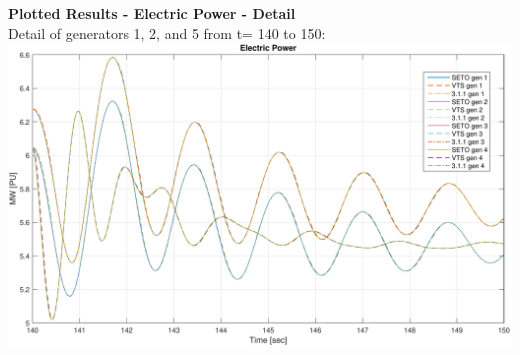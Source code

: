 \textbf{Plotted Results - Electric Power - Detail} \ \\
Detail of generators 1, 2, and 5 from t= 140 to 150:\\
\includegraphics[width=\linewidth]{examples/extendedTerm/verPelectDetail}
